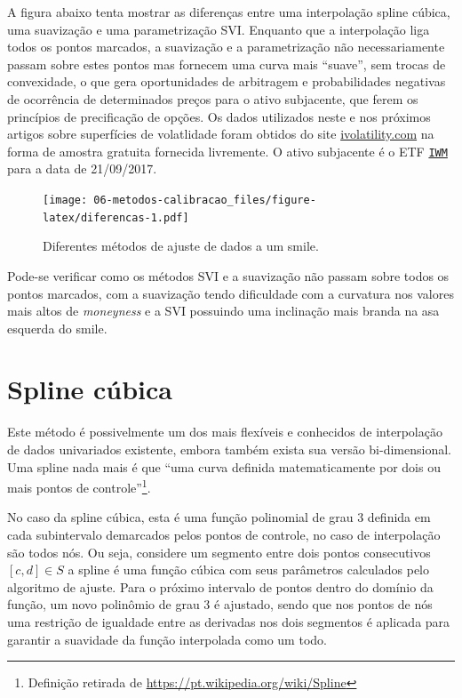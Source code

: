 \documentclass[]{book}
\let\rmarkdownfootnote\footnote%
\def\footnote{\protect\rmarkdownfootnote}
\begin{document}
A figura abaixo tenta mostrar as diferenças entre uma interpolação
spline cúbica, uma suavização e uma parametrização SVI. Enquanto que a
interpolação liga todos os pontos marcados, a suavização e a
parametrização não necessariamente passam sobre estes pontos mas
fornecem uma curva mais ``suave'', sem trocas de convexidade, o que gera
oportunidades de arbitragem e probabilidades negativas de ocorrência de
determinados preços para o ativo subjacente, que ferem os princípios de
precificação de opções. Os dados utilizados neste e nos próximos artigos
sobre superfícies de volatlidade foram obtidos do site
\href{http://www.ivolatility.com/doc/usa/IV_Raw_Delta_surface.csv}{ivolatility.com}
na forma de amostra gratuita fornecida livremente. O ativo subjacente é
o ETF
\href{https://www.ishares.com/us/products/239710/ishares-russell-2000-etf}{\texttt{IWM}}
para a data de 21/09/2017.

\begin{figure}
\centering
\texttt{[image: 06-metodos-calibracao\_files/figure-latex/diferencas-1.pdf]}
\caption{\label{fig:diferencas}Diferentes métodos de ajuste de dados a um
smile.}
\end{figure}

Pode-se verificar como os métodos SVI e a suavização não passam sobre
todos os pontos marcados, com a suavização tendo dificuldade com a
curvatura nos valores mais altos de \emph{moneyness} e a SVI possuindo
uma inclinação mais branda na asa esquerda do smile.

\section{Spline cúbica}\label{spline-cubica}

Este método é possivelmente um dos mais flexíveis e conhecidos de
interpolação de dados univariados existente, embora também exista sua
versão bi-dimensional. Uma spline nada mais é que ``uma curva definida
matematicamente por dois ou mais pontos de controle''\footnote{Definição
  retirada de \url{https://pt.wikipedia.org/wiki/Spline}}.

No caso da spline cúbica, esta é uma função polinomial de grau 3
definida em cada subintervalo demarcados pelos pontos de controle, no
caso de interpolação são todos nós. Ou seja, considere um segmento entre
dois pontos consecutivos \([c, d]\in S\) a spline é uma função cúbica
com seus parâmetros calculados pelo algoritmo de ajuste. Para o próximo
intervalo de pontos dentro do domínio da função, um novo polinômio de
grau 3 é ajustado, sendo que nos pontos de nós uma restrição de
igualdade entre as derivadas nos dois segmentos é aplicada para garantir
a suavidade da função interpolada como um todo.
\end{document}
